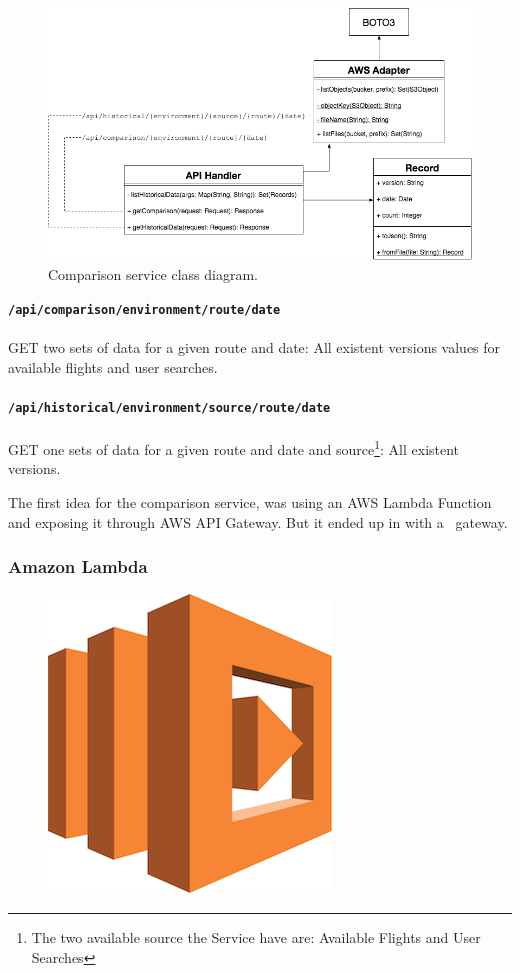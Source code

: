 \begin{figure}[H]
\centering
\includegraphics[scale=0.5]{diagrams/server-architecture.png}
\caption{Comparison service class diagram.}
\end{figure}

\textbf{\texttt{/api/comparison/{environment}/{route}/{date}}}
\\\\
GET two sets of data for a given route and date: All existent versions values for available flights and user searches.
\\\\
\textbf{\texttt{/api/historical/{environment}/{source}/{route}/{date}}}
\\\\
GET one sets of data for a given route and date and source\footnote{The two available source the Service have are: Available Flights and User Searches}: All existent versions.

The first idea for the comparison service, was using an AWS Lambda Function and exposing it through AWS API Gateway. But it ended up in  with a \company\ gateway.

\subsubsection{Amazon Lambda} \label{lambda}

\begin{figure}[H]
\includegraphics[scale=0.1]{resources/lambda-logo.png}
\end{figure}

